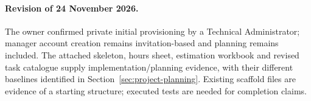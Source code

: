 \paragraph{Revision of 24 November 2026.}
The owner confirmed private initial provisioning by a Technical Administrator;
manager account creation remains invitation-based and planning remains included.
The attached skeleton, hours sheet, estimation workbook and revised task catalogue
supply implementation/planning evidence, with their different baselines identified
in Section~\ref{sec:project-planning}. Existing scaffold files are evidence of a
starting structure; executed tests are needed for completion claims.
